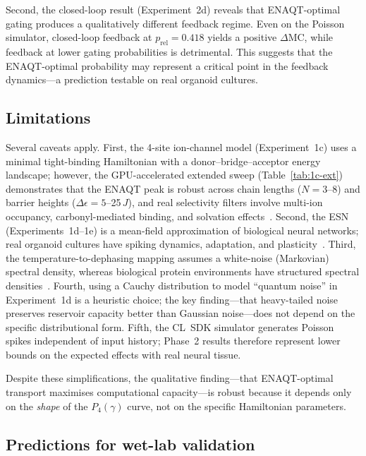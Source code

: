\documentclass[twocolumn,11pt]{article}
\newcommand{\MC}{\mathrm{MC}}
\newcommand{\Pfour}{P_{4}}
\begin{document}
Second, the closed-loop result (Experiment~2d) reveals that
ENAQT-optimal gating produces a qualitatively different feedback
regime.  Even on the Poisson simulator, closed-loop feedback at
$p_{\mathrm{rel}} = 0.418$ yields a positive $\Delta\MC$,
while feedback at lower gating probabilities is detrimental.
This suggests that the ENAQT-optimal probability may represent
a critical point in the feedback dynamics---a prediction
testable on real organoid cultures.

\subsection{Limitations}

Several caveats apply.
First, the 4-site ion-channel model (Experiment~1c) uses a
minimal tight-binding Hamiltonian with a donor--bridge--acceptor
energy landscape; however, the GPU-accelerated extended sweep
(Table~\ref{tab:1c-ext}) demonstrates that the ENAQT peak is
robust across chain lengths ($N = 3$--8) and barrier heights
($\Delta\epsilon = 5$--25\,$J$), and real selectivity filters
involve multi-ion occupancy, carbonyl-mediated binding, and
solvation effects~\cite{Summhammer2012,Salari2015}.
Second, the ESN (Experiments~1d--1e) is a mean-field
approximation of biological neural networks; real organoid
cultures have spiking dynamics, adaptation, and
plasticity~\cite{Kagan2022,Cai2023}.
Third, the temperature-to-dephasing mapping assumes a
white-noise (Markovian) spectral density, whereas biological
protein environments have structured spectral
densities~\cite{Cao2020}.
Fourth, using a Cauchy distribution to model ``quantum noise''
in Experiment~1d is a heuristic choice; the key finding---that
heavy-tailed noise preserves reservoir capacity better than
Gaussian noise---does not depend on the specific
distributional form.
Fifth, the CL~SDK simulator generates Poisson spikes
independent of input history; Phase~2 results therefore
represent lower bounds on the expected effects with real
neural tissue.

Despite these simplifications, the qualitative finding---that
ENAQT-optimal transport maximises computational capacity---is
robust because it depends only on the \emph{shape} of the
$\Pfour(\gamma)$ curve, not on the specific Hamiltonian
parameters.

\subsection{Predictions for wet-lab validation}
\end{document}

